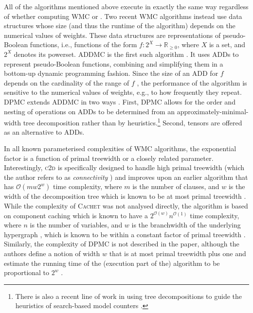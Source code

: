 All of the algorithms mentioned above execute in exactly the same way regardless
of whether computing WMC or \mc{}. Two recent WMC algorithms instead use data
structures whose size (and thus the runtime of the algorithm) depends on the
numerical values of weights. These data structures are representations of
pseudo-Boolean functions, i.e., functions of the form
$f\colon 2^X \to \mathbb{R}_{\ge 0}$, where $X$ is a set, and $2^X$ denotes its
powerset. \textsc{ADDMC} is the first such algorithm
\citep{DBLP:conf/aaai/DudekPV20}. It uses ADDs to represent pseudo-Boolean
functions, combining and simplifying them in a bottom-up dynamic programming
fashion. Since the size of an ADD for $f$ depends on the cardinality of the
range of $f$ \citep{DBLP:journals/fmsd/BaharFGHMPS97}, the performance of the
algorithm is sensitive to the numerical values of weights, e.g., to how
frequently they repeat. \textsc{DPMC} extends \textsc{ADDMC} in two ways
\citep{DBLP:conf/cp/DudekPV20}. First, \textsc{DPMC} allows for the order and
nesting of operations on ADDs to be determined from an
approximately-minimal-width tree decomposition rather than by
heuristics.\footnote{There is also a recent line of work in using tree
  decompositions to guide the heuristics of search-based model counters
  \citep{DBLP:conf/cp/KorhonenJ21}.} Second, tensors are offered as an
alternative to ADDs.

In all known parameterised complexities of WMC algorithms, the exponential
factor is a function of primal treewidth or a closely related parameter.
Interestingly, \textsc{c2d} is specifically designed to handle high primal
treewidth (which the author refers to as \emph{connectivity}
\citep{DBLP:conf/ijcai/Darwiche99}) and improves upon an earlier algorithm that
has $\mathcal{O}(mw2^w)$ time complexity, where $m$ is the number of clauses,
and $w$ is the width of the decomposition tree which is known to be at most
primal treewidth
\citep{DBLP:journals/jacm/Darwiche01,DBLP:conf/ecai/Darwiche04}. While the
complexity of \textsc{Cachet} was not analysed directly, the algorithm is based
on component caching which is known to have a
$2^{\mathcal{O}(w)}n^{\mathcal{O}(1)}$ time complexity, where $n$ is the number
of variables, and $w$ is the branchwidth of the underlying hypergraph
\citep{DBLP:journals/jair/BacchusDP09,DBLP:conf/sat/SangBBKP04}, which is known
to be within a constant factor of primal treewidth
\citep{DBLP:journals/jct/RobertsonS91}. Similarly, the complexity of
\textsc{DPMC} is not described in the paper, although the authors define a
notion of width $w$ that is at most primal treewidth plus one and estimate the
running time of the (execution part of the) algorithm to be proportional to
$2^w$ \citep{DBLP:conf/cp/DudekPV20}.


